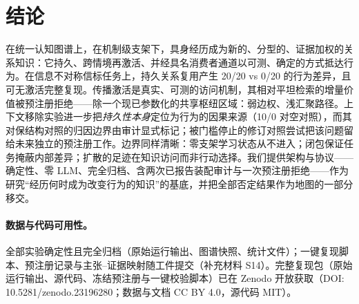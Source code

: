 \documentclass[10pt,a4paper]{ctexart}
\begin{document}
\section{结论}
在统一认知图谱上，在机制级支架下，具身经历成为新的、分型的、证据加权的关系知识：它持久、跨情境再激活、并经具名消费者通道以可测、确定的方式抵达行为。在信息不对称信标任务上，持久关系复用产生 20/20 vs 0/20 的行为差异，且可无激活完整复现。传播激活是真实、可测的访问机制，其相对平坦检索的增量价值被预注册拒绝——除一个现已参数化的共享枢纽区域：弱边权、浅汇聚路径。上下文移除实验进一步把\emph{持久性本身}定位为行为的因果来源（10/0 对空对照），而其对保结构对照的归因边界由审计显式标记；被门槛停止的修订对照尝试把该问题留给未来独立的预注册工作。边界同样清晰：零支架学习状态从不进入；闭包保证任务掩蔽内部差异；扩散的足迹在知识访问而非行动选择。我们提供架构与协议——确定性、零 LLM、完全归档、含两次已报告装配审计与一次预注册拒绝——作为研究“经历何时成为改变行为的知识”的基底，并把全部否定结果作为地图的一部分移交。

\paragraph{数据与代码可用性。}全部实验确定性且完全归档（原始运行输出、图谱快照、统计文件）；一键复现脚本、预注册记录与主张--证据映射随工件提交（补充材料 S14）。完整复现包（原始运行输出、源代码、冻结预注册与一键校验脚本）已在 Zenodo 开放获取（DOI: 10.5281/zenodo.23196280；数据与文档 CC BY 4.0，源代码 MIT）。



\end{document}
